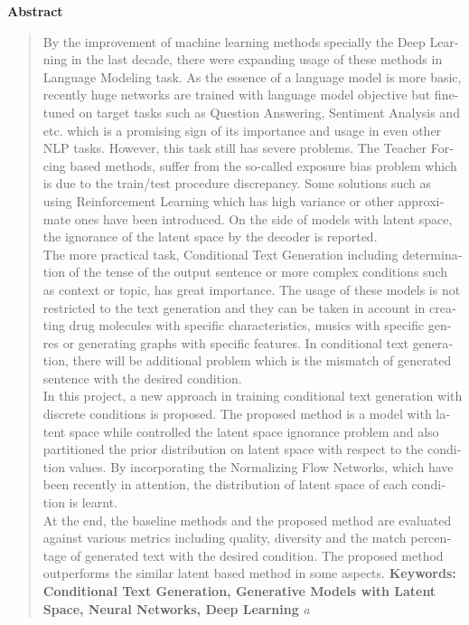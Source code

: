 \thispagestyle{empty} 

\begin{latin}
\centerline{\textbf{\large{Abstract}}}
\begin{quote}
    By the improvement of machine learning methods specially the Deep Learning in the last decade, there were expanding usage of these methods in Language Modeling task. As the essence of a language model is more basic, recently huge networks are trained with language model objective but fine-tuned on target tasks such as Question Answering, Sentiment Analysis and etc.
    which is a promising sign of its importance and usage in even other NLP tasks. However, this task still has severe problems. The Teacher Forcing based methods, suffer from the so-called exposure bias problem which is due to the train/test procedure discrepancy. Some solutions such as using Reinforcement Learning which has high variance or other approximate ones have been introduced. On the side of models with latent space, the ignorance of the latent space by the decoder is reported.
    \\
    The more practical task, Conditional Text Generation including determination of the tense of the output sentence or more complex conditions such as context or topic, has great importance. The usage of these models is not restricted to the text generation and they can be taken in account in creating drug molecules with specific characteristics, musics with specific genres or generating graphs with specific features. In conditional text generation, there will be additional problem which is the mismatch of generated sentence with the desired condition.
    \\
    In this project, a new approach in training conditional text generation with discrete conditions is proposed. The proposed method is a model with latent space while controlled the latent space ignorance problem and also partitioned the prior distribution on latent space with respect to the condition values. By incorporating the Normalizing Flow Networks, which have been recently in attention, the distribution of latent space of each condition is learnt.
    \\
    At the end, the baseline methods and the proposed method are evaluated against various metrics including quality, diversity and the match percentage of generated text with the desired condition. The proposed method outperforms the similar latent based method in some aspects.
\vskip 1cm
\textbf{Keywords: Conditional Text Generation, Generative Models with Latent Space, Neural Networks, Deep Learning} \textit{a}
\end{quote}
\end{latin}

